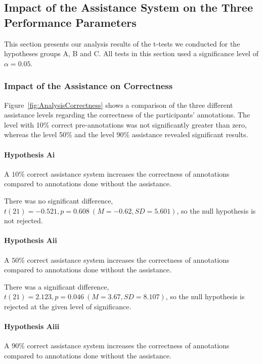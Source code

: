 \subsection{Impact of the Assistance System on the Three Performance Parameters}
	\label{sec:resultsHypAC}
	This section presents our analysis results of the t-tests we conducted for the hypotheses groups A, B and C.
	All tests in this section used a significance level of \(\alpha = 0.05\).

	\subsubsection{Impact of the Assistance on Correctness}
		Figure~\ref{fig:AnalysisCorrectness} shows a comparison of the three different assistance levels regarding the correctness of the participants' annotations. The level with 10\% correct pre-annotations was not significantly greater than zero, whereas the level 50\% and the level 90\% assistance revealed significant results.


		\paragraph{Hypothesis Ai}
		\lqq A \(10\%\) correct assistance system increases the correctness of annotations compared to annotations done without the assistance.\rqq

		There was no significant difference, \(t(21) = -0.521, p = 0.608\ (M = -0.62, SD = 5.601)\), so the null hypothesis is not rejected.

		\paragraph{Hypothesis Aii}
		\lqq A \(50\%\) correct assistance system increases the correctness of annotations compared to annotations done without the assistance.\rqq

		There was a significant difference, \(t(21) = 2.123, p = 0.046\ (M = 3.67, SD = 8.107)\), so the null hypothesis is rejected at the given level of significance.

		\paragraph{Hypothesis Aiii}
		\lqq A \(90\%\) correct assistance system increases the correctness of annotations compared to annotations done without the assistance.\rqq

